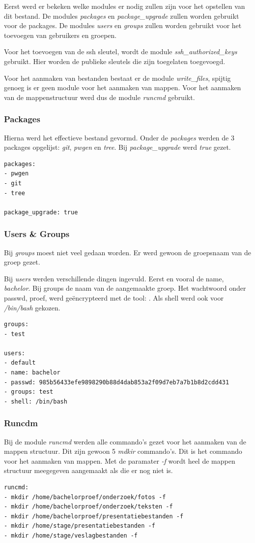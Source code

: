 Eerst werd er bekeken welke modules er nodig zullen zijn voor het opstellen van dit bestand. De modules \textit{packages} en \textit{package\_upgrade} zullen worden gebruikt voor de packages. De modules \textit{users} en \textit{groups} zullen worden gebruikt voor het toevoegen van gebruikers en groepen. 

Voor het toevoegen van de ssh sleutel, wordt de module \textit{ssh\_authorized\_keys} gebruikt. Hier worden de publieke sleutels die zijn toegelaten toegevoegd.

Voor het aanmaken van bestanden bestaat er de module \textit{write\_files}, spijtig genoeg is er geen module voor het aanmaken van mappen. Voor het aanmaken van de mappenstructuur werd dus de module \textit{runcmd} gebruikt.

\subsubsection{Packages}
Hierna werd het effectieve bestand gevormd. Onder de \textit{packages} werden de 3 packages opgelijst: \textit{git}, \textit{pwgen} en \textit{tree}. Bij \textit{package\_upgrade} werd \textit{true} gezet. 
\begin{lstlisting}
packages:
- pwgen
- git
- tree

package_upgrade: true
\end{lstlisting}

\subsubsection{Users \& Groups}
Bij \textit{groups} moest niet veel gedaan worden. Er werd gewoon de groepsnaam van de groep gezet.

Bij \textit{users} werden verschillende dingen ingevuld. Eerst en vooral de name, \textit{bachelor}. Bij groups de naam van de aangemaakte groep. Het wachtwoord onder passwd, proef, werd geëncrypteerd met de tool: \autocite{toolmkpass}. Als shell werd ook voor \textit{/bin/bash} gekozen.
\begin{lstlisting}
groups:
- test

users:
- default
- name: bachelor
- passwd: 985b56433efe9898290b88d4dab853a2f09d7eb7a7b1b8d2cdd431
- groups: test
- shell: /bin/bash
\end{lstlisting}


\subsubsection{Runcdm}
Bij de module \textit{runcmd} werden alle commando's gezet voor het aanmaken van de mappen structuur. Dit zijn gewoon 5 \textit{mdkir} commando's. Dit is het commando voor het aanmaken van mappen. Met de paramater \textit{-f} wordt heel de mappen structuur meegegeven aangemaakt als die er nog niet is.
\begin{lstlisting}
runcmd:
- mkdir /home/bachelorproef/onderzoek/fotos -f
- mkdir /home/bachelorproef/onderzoek/teksten -f
- mkdir /home/bachelorproef/presentatiebestanden -f
- mkdir /home/stage/presentatiebestanden -f
- mkdir /home/stage/veslagbestanden -f
\end{lstlisting}


